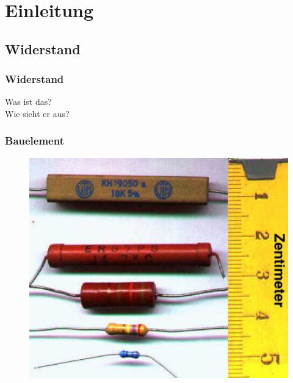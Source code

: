 

\subtitle{Technik Klasse E 04: \\
  Der Widerstand und seine Schaltungsarten \\[2em]}
\date{Stand 17.10.2016}


\section*{Einleitung}
\subsection*{Widerstand}

\begin{frame}
  \frametitle{Widerstand}
  \begin{center}
    \Large{Was ist das?} \\
    \Large{Wie sieht er aus?}
  \end{center}
\end{frame}


\begin{frame}
  \frametitle{Bauelement}

  \begin{center}
    \begin{figure}
      \includegraphics[width=1\textwidth,height=.75\textheight,keepaspectratio]{e04/Widerstaende.jpg}
    \end{figure}
  \end{center}


\end{frame}

